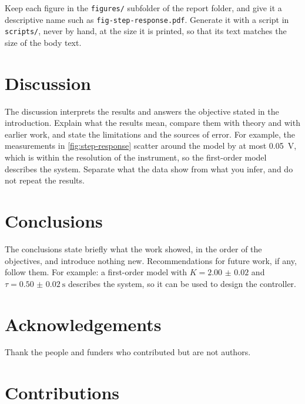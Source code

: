 \documentclass[10pt,a4paper,twocolumn]{article}
\begin{document}
Keep each figure in the \texttt{figures/} subfolder of the report folder, and give it a descriptive name such as \texttt{fig-step-response.pdf}.
Generate it with a script in \texttt{scripts/}, never by hand, at the size it is printed, so that its text matches the size of the body text.

\section{Discussion}
\label{sec:discussion}

The discussion interprets the results and answers the objective stated in the introduction.
Explain what the results mean, compare them with theory and with earlier work, and state the limitations and the sources of error.
For example, the measurements in \cref{fig:step-response} scatter around the model by at most \qty{0.05}{\volt}, which is within the resolution of the instrument, so the first-order model describes the system.
Separate what the data show from what you infer, and do not repeat the results.

\section{Conclusions}
\label{sec:conclusions}

The conclusions state briefly what the work showed, in the order of the objectives, and introduce nothing new.
Recommendations for future work, if any, follow them.
For example: a first-order model with $K = \num{2.00(2)}$ and $\tau = \qty{0.50(2)}{\second}$ describes the system, so it can be used to design the controller.

\section*{Acknowledgements}

Thank the people and funders who contributed but are not authors.

\section*{Contributions}
\label{sec:contributions}
\end{document}

